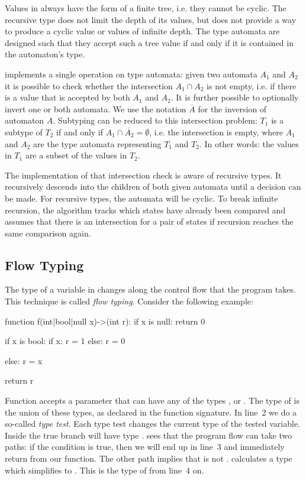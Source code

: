 Values in \whiley always have the form of a finite tree, i.e. they cannot be cyclic.
The recursive type  does not limit the depth of its values, but \whiley does not provide a way to produce a cyclic value or values of infinite depth.
The type automata are designed such that they accept such a tree value if and only if it is contained in the automaton's type.

\whiley implements a single operation on type automata:
given two automata $A_1$ and $A_2$ it is possible to check whether the intersection $A_1 \cap A_2$ is not empty, i.e. if there is a value that is accepted by both $A_1$ and $A_2$.
It is further possible to optionally invert one or both automata.
We use the notation $\overline{A}$ for the inversion of automaton $A$.
Subtyping can be reduced to this intersection problem:
$T_1$ is a subtype of $T_2$ if and only if $A_1 \cap \overline{A_2} = \emptyset$, i.e. the intersection is empty, where $A_1$ and $A_2$ are the type automata representing $T_1$ and $T_2$.
In other words: the values in $T_1$ are a subset of the values in $T_2$.

The implementation of that intersection check is aware of recursive types.
It recursively descends into the children of both given automata until a decision can be made.
For recursive types, the automata will be cyclic.
To break infinite recursion, the algorithm tracks which states have already been compared and assumes that there is an intersection for a pair of states if recursion reaches the same comparison again.


\subsection{Flow Typing}\label{section:background-whiley-flow-typing}

The type of a variable in \whiley changes along the control flow that the program takes.
This technique is called \emph{flow typing}.
Consider the following example:

\begin{whileycode}
function f(int|bool|null x)->(int r):
	if x is null:
		return 0

	if x is bool:
		if x:
			r = 1
		else:
			r = 0

	else:
		r = x

	return r
\end{whileycode}

Function  accepts a parameter that can have any of the types ,  or .
The type of  is the union of these types, as declared in the function signature.
In line~2 we do a so-called \emph{type test}.
Each type test changes the current type of the tested variable.
Inside the true branch  will have type .
\whiley sees that the program flow can take two paths: if the condition is true, then we will end up in line~3 and immediately return from our function.
The other path implies that  is not .
\whiley calculates a type  which simplifies to .
This is the type of  from line~4 on.

